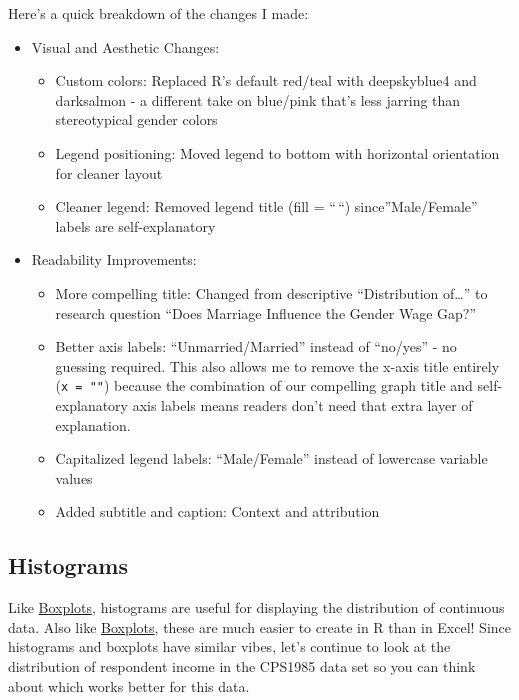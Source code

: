 \documentclass[
  letterpaper,
]{book}
\begin{document}
Here's a quick breakdown of the changes I made:

\begin{itemize}
\item
  Visual and Aesthetic Changes:

  \begin{itemize}
  \item
    Custom colors: Replaced R's default red/teal with deepskyblue4 and
    darksalmon - a different take on blue/pink that's less jarring than
    stereotypical gender colors
  \item
    Legend positioning: Moved legend to bottom with horizontal
    orientation for cleaner layout
  \item
    Cleaner legend: Removed legend title (fill = ``\,``)
    since''Male/Female'' labels are self-explanatory
  \end{itemize}
\item
  Readability Improvements:

  \begin{itemize}
  \item
    More compelling title: Changed from descriptive ``Distribution
    of\ldots{}'' to research question ``Does Marriage Influence the
    Gender Wage Gap?''
  \item
    Better axis labels: ``Unmarried/Married'' instead of ``no/yes'' - no
    guessing required. This also allows me to remove the x-axis title
    entirely (\texttt{x\ =\ ""}) because the combination of our
    compelling graph title and self-explanatory axis labels means
    readers don't need that extra layer of explanation.
  \item
    Capitalized legend labels: ``Male/Female'' instead of lowercase
    variable values
  \item
    Added subtitle and caption: Context and attribution
  \end{itemize}
\end{itemize}

\subsection{Histograms}\label{histograms}

Like \hyperref[boxplots]{Boxplots}, histograms are useful for displaying
the distribution of continuous data. Also like
\hyperref[boxplots]{Boxplots}, these are much easier to create in R than
in Excel! Since histograms and boxplots have similar vibes, let's
continue to look at the distribution of respondent income in the CPS1985
data set so you can think about which works better for this data.
\end{document}
